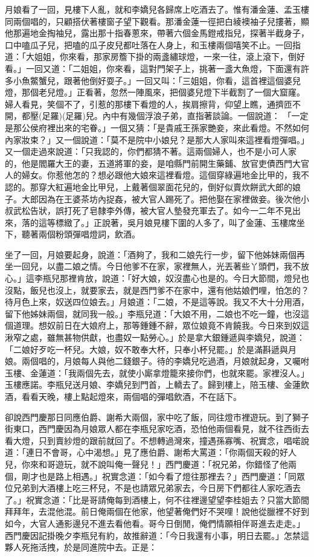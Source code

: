 月娘看了一回，見樓下人亂，就和李嬌兒各歸席上吃酒去了。惟有潘金蓮、孟玉樓同兩個唱的，只顧搭伏著樓窗子望下觀看。那潘金蓮一徑把白綾襖袖子兒摟著，顯他那遍地金掏袖兒，露出那十指春蔥來，帶著六個金馬鐙戒指兒，探著半截身子，口中嗑瓜子兒，把嗑的瓜子皮兒都吐落在人身上，和玉樓兩個嘻笑不止。一回指道：「大姐姐，你來看，那家房簷下掛的兩盞繡球燈，一來一往，滾上滾下，倒好看。」一回又道：「二姐姐，你來看，這對門架子上，挑著一盞大魚燈，下面還有許多小魚鱉蟹兒，跟著他倒好耍子。」一回又叫：「三姐姐，你看，這首裡這個婆兒燈，那個老兒燈。」正看著，忽然一陣風來，把個婆兒燈下半截割了一個大窟窿。婦人看見，笑個不了，引惹的那樓下看燈的人，挨肩擦背，仰望上瞧，通擠匝不開，都壓(足羅)(足羅)兒。內中有幾個浮浪子弟，直指著談論。一個說道： 「一定是那公侯府裡出來的宅眷。」一個又猜：「是貴戚王孫家艷妾，來此看燈。不然如何內家妝束？」又一個說道：「莫不是院中小娘兒？是那大人家叫來這裡看燈彈唱。」又一個走過來說道：「只我認的，你們都猜不著。這兩個婦人，也不是小可人家的，他是閻羅大王的妻，五道將軍的妾，是咱縣門前開生藥鋪、放官吏債西門大官人的婦女。你惹他怎的？想必跟他大娘來這裡看燈。這個穿綠遍地金比甲的，我不認的。那穿大紅遍地金比甲兒，上戴著個翠面花兒的，倒好似賣炊餅武大郎的娘子。大郎因為在王婆茶坊內捉姦，被大官人踢死了。把他娶在家裡做妾。後次他小叔武松告狀，誤打死了皂隸李外傳，被大官人墊發充軍去了。如今一二年不見出來，落的這等標緻了。」正說著，吳月娘見樓下圍的人多了，叫了金蓮、玉樓席坐下，聽著兩個粉頭彈唱燈詞，飲酒。

坐了一回，月娘要起身，說道：「酒夠了，我和二娘先行一步，留下他姊妹兩個再坐一回兒，以盡二娘之情。今日他爹不在家，家裡無人，光丟著些丫頭們，我不放心。」這李瓶兒那裡肯放，說道：「好大娘，奴沒盡心也是的。今日大節間，燈兒也沒點，飯兒也沒上，就要家去，就是西門爹不在家中，還有他姑娘們哩，怕怎的？待月色上來，奴送四位娘去。」月娘道：「二娘，不是這等說。我又不大十分用酒，留下他姊妹兩個，就同我一般。」李瓶兒道：「大娘不用，二娘也不吃一鐘，也沒這個道理。想奴前日在大娘府上，那等鍾鍾不辭，眾位娘竟不肯饒我。今日來到奴這湫窄之處，雖無甚物供獻，也盡奴一點勞心。」於是拿大銀鍾遞與李嬌兒，說道：「二娘好歹吃一杯兒。大娘，奴不敢奉大杯，只奉小杯兒罷。」於是滿斟遞與月娘。兩個唱的，月娘每人與他二錢銀子。待的李嬌兒吃過酒，月娘就起身，又囑咐玉樓、金蓮道：「我兩個先去，就使小廝拿燈籠來接你們，也就來罷。家裡沒人。」玉樓應諾。李瓶兒送月娘、李嬌兒到門首，上轎去了。歸到樓上，陪玉樓、金蓮飲酒，看看天晚，樓上點起燈來，兩個唱的彈唱飲酒，不在話下。

卻說西門慶那日同應伯爵、謝希大兩個，家中吃了飯，同往燈市裡遊玩。到了獅子街東口，西門慶因為月娘眾人都在李瓶兒家吃酒，恐怕他兩個看見，就不往西街去看大燈，只到賣紗燈的跟前就回了。不想轉過灣來，撞遇孫寡嘴、祝實念，唱喏說道：「連日不會哥，心中渴想。」見了應伯爵、謝希大罵道：「你兩個天殺的好人兒，你來和哥遊玩，就不說叫俺一聲兒！」西門慶道：「祝兄弟，你錯怪了他兩個，剛才也是路上相遇。」祝實念道：「如今看了燈往那裡去？」西門慶道：「同眾位兄弟到大酒樓上吃三杯兒，不是也請眾兄弟家去，今日房下們都往人家吃酒去了。」祝實念道：「比是哥請俺每到酒樓上，何不往裡邊望望李桂姐去？只當大節間拜拜年，去混他混。前日俺兩個在他家，他望著俺們好不哭哩！說他從臘裡不好到如今，大官人通影邊兒不進去看他看。哥今日倒閒，俺們情願相伴哥進去走走。」 西門慶因記掛晚夕李瓶兒有約，故推辭道：「今日我還有小事，明日去罷。」怎禁這夥人死拖活拽，於是同進院中去。正是：

